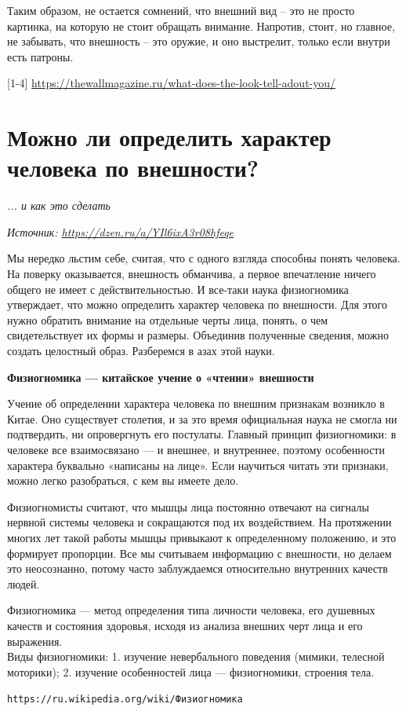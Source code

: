 Таким образом, не остается сомнений, что внешний вид – это не просто картинка, на которую не стоит обращать внимание. Напротив, стоит, но главное, не забывать, что внешность – это оружие, и оно выстрелит, только если внутри есть патроны.

[1-4]  \url{https://thewallmagazine.ru/what-does-the-look-tell-adout-you/}


\newpage
\section{Можно ли определить характер человека по внешности?}

\textit{... и как это сделать}

\textit{Источник: \url{https://dzen.ru/a/YIl6ixA3r08hfeqe}}

Мы нередко льстим себе, считая, что с одного взгляда способны понять человека. На поверку оказывается, внешность обманчива, а первое впечатление ничего общего не имеет с действительностью. И все-таки наука физиогномика утверждает, что можно определить характер человека по внешности. Для этого нужно обратить внимание на отдельные черты лица, понять, о чем свидетельствует их формы и размеры. Объединив полученные сведения, можно создать целостный образ. Разберемся в азах этой науки.

\textbf{Физиогномика — китайское учение о «чтении» внешности}

Учение об определении характера человека по внешним признакам возникло в Китае. Оно существует столетия, и за это время официальная наука не смогла ни подтвердить, ни опровергнуть его постулаты. Главный принцип физиогномики: в человеке все взаимосвязано — и внешнее, и внутреннее, поэтому особенности характера буквально «написаны на лице». Если научиться читать эти признаки, можно легко разобраться, с кем вы имеете дело.

Физиогномисты считают, что мышцы лица постоянно отвечают на сигналы нервной системы человека и сокращаются под их воздействием. На протяжении многих лет такой работы мышцы привыкают к определенному положению, и это формирует пропорции. Все мы считываем информацию с внешности, но делаем это неосознанно, потому часто заблуждаемся относительно внутренних качеств людей.

\begin{fancyquotes}
    Физиогномика --- метод определения типа личности человека, его душевных качеств и состояния здоровья, исходя из анализа внешних черт лица и его выражения.\\

    Виды физиогномики: 1. изучение невербального поведения (мимики, телесной моторики); 2. изучение особенностей лица — физиогномики, строения тела.\\

    \begin{flushright}
        \texttt{https://ru.wikipedia.org/wiki/Физиогномика}
    \end{flushright}
\end{fancyquotes}

